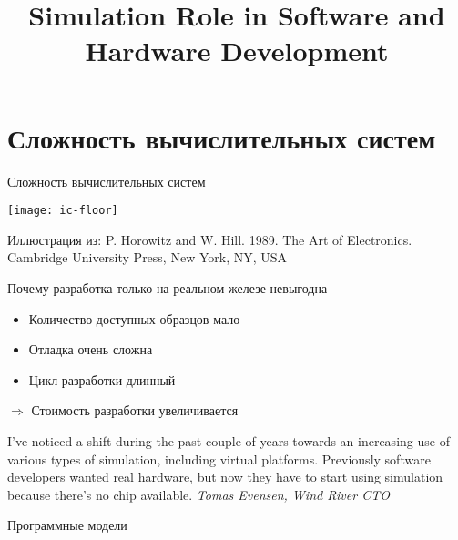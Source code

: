 

\title{Simulation Role in Software and Hardware Development}



\begin{frame}
    \maketitle
\end{frame}

\begin{frame}
    \tableofcontents
\end{frame}

\section{Сложность вычислительных систем}

\begin{frame}{Сложность вычислительных систем}

\centering
\texttt{[image: ic-floor]}

\tiny{Иллюстрация из: P. Horowitz and W. Hill. 1989. The Art of Electronics. Cambridge University Press, New York, NY, USA}

\end{frame}

\begin{frame}{Почему разработка только на реальном железе невыгодна }

\begin{itemize}
\item Количество доступных образцов мало
\item Отладка очень сложна
\item Цикл разработки длинный
\end{itemize}

$\Rightarrow$ Стоимость разработки увеличивается

\bigskip

\tiny{I've noticed a shift during the past couple of years towards an increasing use of various types of simulation, including virtual platforms. Previously software developers wanted real hardware, but now they have to start using simulation because there's no chip available. \textit{Tomas Evensen, Wind River CTO}}

\end{frame}

\begin{frame}{Программные модели}
\centering 
{}

\end{frame}


